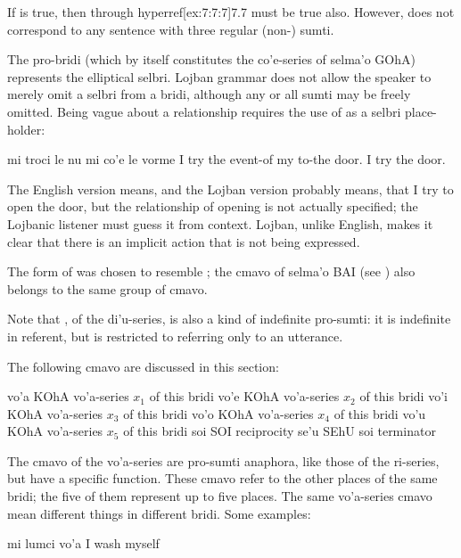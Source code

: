 If  is true, then  through hyperref[ex:7:7:7]{7.7}
    must be true also. However, 
    does not correspond to any sentence with three regular
    (non-) sumti.

The pro-bridi  (which by itself constitutes the
    co'e-series of selma'o GOhA) represents the elliptical selbri.
    Lojban grammar does not allow the speaker to merely omit a
    selbri from a bridi, although any or all sumti may be freely
    omitted. Being vague about a relationship requires the use of
     as a selbri place-holder:
\begin{example}
mi troci le nu\n
\T	mi co'e le vorme\n
I try the event-of\n
\T	my  to-the door.\n
I try the door.
\end{example}

The English version means, and the Lojban version probably
    means, that I try to open the door, but the relationship of
    opening is not actually specified; the Lojbanic listener must
    guess it from context. Lojban, unlike English, makes it clear
    that there is an implicit action that is not being
    expressed.

The form of  was chosen to resemble ; the
    cmavo  of selma'o BAI (see ) also belongs to the same group of cmavo.

Note that , of the di'u-series, is also a kind of
    indefinite pro-sumti: it is indefinite in referent, but is
    restricted to referring only to an utterance.



The following cmavo are discussed in this section:

   vo'a    KOhA    vo'a-series $x_1$ of this bridi
    vo'e    KOhA    vo'a-series $x_2$ of this bridi
    vo'i    KOhA    vo'a-series $x_3$ of this bridi
    vo'o    KOhA    vo'a-series $x_4$ of this bridi
    vo'u    KOhA    vo'a-series $x_5$ of this bridi
    soi SOI         reciprocity
    se'u    SEhU            soi terminator

The cmavo of the vo'a-series are pro-sumti anaphora, like those
    of the ri-series, but have a specific function. These cmavo
    refer to the other places of the same bridi; the five of them
    represent up to five places. The same vo'a-series cmavo mean
    different things in different bridi. Some examples:
\begin{example}
mi lumci vo'a\n
I wash myself
\end{example}

